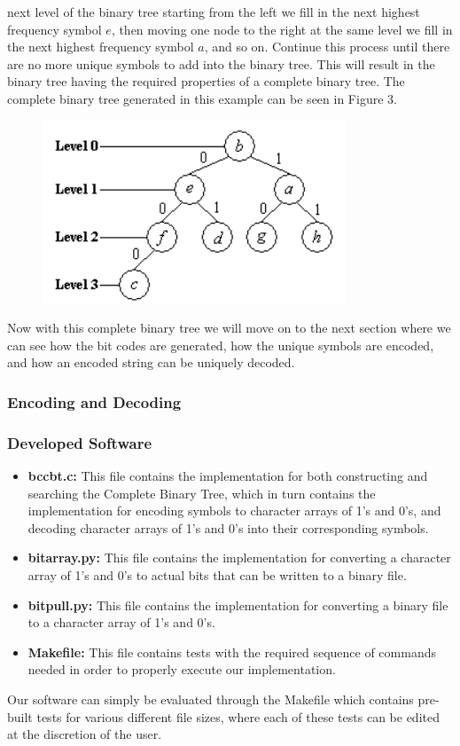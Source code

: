 \documentclass[12pt]{IEEEtran}
\begin{document}
next level of the binary tree starting from the left we fill in the next highest frequency symbol $e$, then moving one node to
the right at the same level we fill in the next highest frequency symbol $a$, and so on. Continue this process until there are no
more unique symbols to add into the binary tree. This will result in the binary tree having the required properties of a complete binary tree.
The complete binary tree generated in this example can be seen in Figure 3.
\begin{figure}
\centering
\includegraphics[scale=0.6]{../presentation/images/completebinarytree.PNG}
\caption{\cite{Sjostrand}}
\end{figure}
Now with this complete binary tree we will move on to the next section where we can see how the bit codes are generated, how
the unique symbols are encoded, and how an encoded string can be uniquely decoded.

\subsubsection{Encoding and Decoding}
\subsubsection{Developed Software}
\begin{itemize}
\item \textbf{bccbt.c:} This file contains the implementation for both constructing and searching the Complete Binary Tree,
which in turn contains the implementation for encoding symbols to character arrays of 1's and 0's,
and decoding character arrays of 1's and 0's into their corresponding symbols.
\item \textbf{bitarray.py:} This file contains the implementation for converting a character array of 1's and 0's
to actual bits that can be written to a binary file.
\item \textbf{bitpull.py:} This file contains the implementation for converting a binary file to a character
array of 1's and 0's.
\item \textbf{Makefile:} This file contains tests with the required sequence of commands needed
in order to properly execute our implementation.
\end{itemize}
Our software can simply be evaluated through the Makefile which contains pre-built tests for various different file sizes,
where each of these tests can be edited at the discretion of the user.
\end{document}
